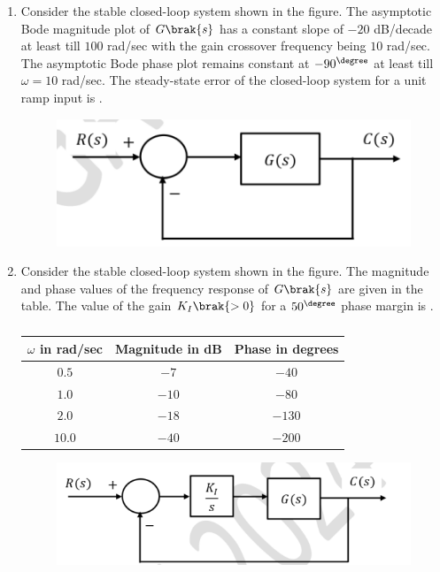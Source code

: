 \documentclass[journal,12pt,onecolumn]{IEEEtran}
\theoremstyle{remark}
\begin{document}
\begin{enumerate}[start=1, label=Q.\arabic*]
    \hfill{}

    \item Consider the stable closed-loop system shown in the figure. The asymptotic Bode magnitude plot of $G\brak{s}$ has a constant slope of $-20$ dB/decade at least till $100$ rad/sec with the gain crossover frequency being $10$ rad/sec. The asymptotic Bode phase plot remains constant at $-90^\degree$ at least till $\omega = 10$ rad/sec. The steady-state error of the closed-loop system for a unit ramp input is \underline{\hspace{2cm}} .
    \begin{figure}[H]
        \includegraphics[width=0.6\columnwidth]{Figures/q58.png}
        \centering
        \caption{}
    \end{figure}

    \hfill{}
\item Consider the stable closed-loop system shown in the figure. The magnitude and phase values of the frequency response of $G\brak{s}$ are given in the table. The value of the gain $K_I \brak{>0}$ for a $50^\degree$ phase margin is \underline{\hspace{2cm}} .
    \begin{table}[H]
        \centering
        \caption*{}
        \label{tab:freqresp}
        \begin{tabular}{|c|c|c|}
            \hline
            $\omega$ in rad/sec & Magnitude in dB & Phase in degrees \\
            \hline
            $0.5$ & $-7$ & $-40$ \\
            $1.0$ & $-10$ & $-80$ \\
            $2.0$ & $-18$ & $-130$ \\
            $10.0$ & $-40$ & $-200$ \\
            \hline
        \end{tabular}
    \end{table}
    \begin{figure}[H]
        \includegraphics[width=0.7\columnwidth]{Figures/q59.png}
        \centering
        \caption{}
    \end{figure}


\end{enumerate}
\end{document}
